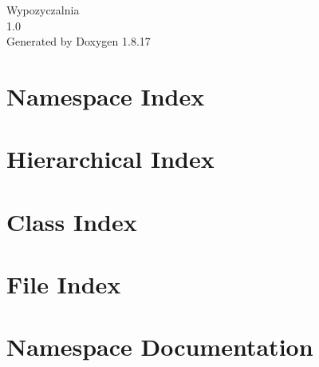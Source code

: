 \let\mypdfximage\pdfximage\def\pdfximage{\immediate\mypdfximage}\documentclass[twoside]{book}
\newcommand{\+}{\discretionary{\mbox{\scriptsize$\hookleftarrow$}}{}{}}
\newcommand{\clearemptydoublepage}{%
  \newpage{\pagestyle{empty}\cleardoublepage}%
}
\begin{document}
\hypersetup{pageanchor=false,
             bookmarksnumbered=true,
             pdfencoding=unicode
            }
\begin{titlepage}
\vspace*{7cm}
\begin{center}%
{\Large Wypozyczalnia \\[1ex]\large 1.\+0 }\\
\vspace*{1cm}
{\large Generated by Doxygen 1.8.17}\\
\end{center}
\end{titlepage}
\clearemptydoublepage
{}
\tableofcontents
\clearemptydoublepage
{}
\hypersetup{pageanchor=true}

\chapter{Namespace Index}

\chapter{Hierarchical Index}

\chapter{Class Index}

\chapter{File Index}

\chapter{Namespace Documentation}



\end{document}
